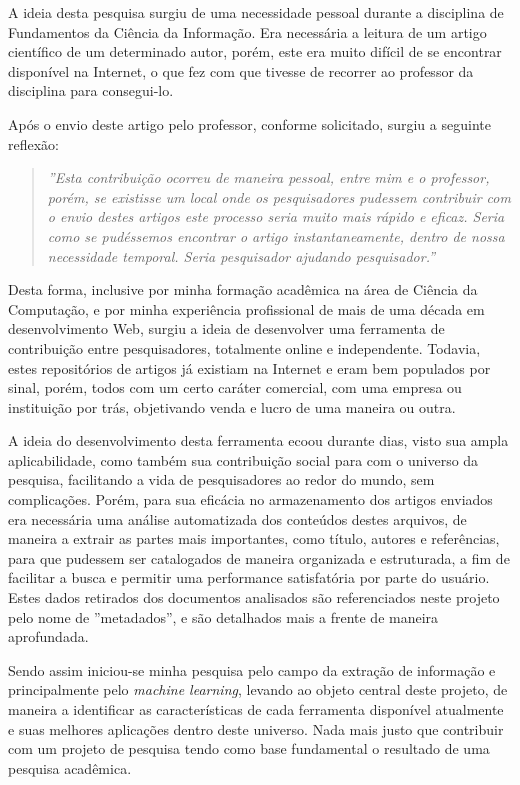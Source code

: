 
\begin{textonovo}

A ideia desta pesquisa surgiu de uma necessidade pessoal durante a disciplina de Fundamentos da Ciência da Informação. Era necessária a leitura de um artigo científico de um determinado autor, porém, este era muito difícil de se encontrar disponível na Internet, o que fez com que tivesse de recorrer ao professor da disciplina para consegui-lo.

Após o envio deste artigo pelo professor, conforme solicitado, surgiu a seguinte reflexão:

\begin{quote}
\textit{''Esta contribuição ocorreu de maneira pessoal, entre mim e o professor, porém, se existisse um local onde os pesquisadores pudessem contribuir com o envio destes artigos este processo seria muito mais rápido e eficaz. Seria como se pudéssemos encontrar o artigo instantaneamente, dentro de nossa necessidade temporal. Seria pesquisador ajudando pesquisador.''}
\end{quote}

Desta forma, inclusive por minha formação acadêmica na área de Ciência da Computação, e por minha experiência profissional de mais de uma década em desenvolvimento Web, surgiu a ideia de desenvolver uma ferramenta de contribuição entre pesquisadores, totalmente online e independente. Todavia, estes repositórios de artigos já existiam na Internet e eram bem populados por sinal, porém, todos com um certo caráter comercial, com uma empresa ou instituição por trás, objetivando venda e lucro de uma maneira ou outra.

A ideia do desenvolvimento desta ferramenta ecoou durante dias, visto sua ampla aplicabilidade, como também sua contribuição social para com o universo da pesquisa, facilitando a vida de pesquisadores ao redor do mundo, sem complicações. Porém, para sua eficácia no armazenamento dos artigos enviados era necessária uma análise automatizada dos conteúdos destes arquivos, de maneira a extrair as partes mais importantes, como título, autores e referências, para que pudessem ser catalogados de maneira organizada e estruturada, a fim de facilitar a busca e permitir uma performance satisfatória por parte do usuário. Estes dados retirados dos documentos analisados são referenciados neste projeto pelo nome de ''metadados'', e são detalhados mais a frente de maneira aprofundada.

Sendo assim iniciou-se minha pesquisa pelo campo da extração de informação e principalmente pelo \textit{machine learning}, levando ao objeto central deste projeto, de maneira a identificar as características de cada ferramenta disponível atualmente e suas melhores aplicações dentro deste universo. Nada mais justo que contribuir com um projeto de pesquisa tendo como base fundamental o resultado de uma pesquisa acadêmica.

\end{textonovo}

